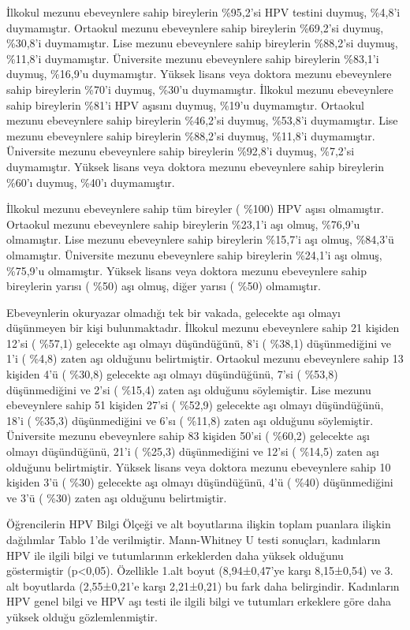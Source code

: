 \documentclass[turkish]{article}
\begin{document}
İlkokul mezunu ebeveynlere sahip bireylerin  \%95,2’si HPV testini duymuş,  \%4,8’i duymamıştır. Ortaokul mezunu ebeveynlere sahip bireylerin  \%69,2’si duymuş,  \%30,8’i duymamıştır. Lise mezunu ebeveynlere sahip bireylerin  \%88,2’si duymuş,  \%11,8’i duymamıştır. Üniversite mezunu ebeveynlere sahip bireylerin  \%83,1’i duymuş,  \%16,9’u duymamıştır. Yüksek lisans veya doktora mezunu ebeveynlere sahip bireylerin  \%70’i duymuş,  \%30’u duymamıştır.
İlkokul mezunu ebeveynlere sahip bireylerin  \%81’i HPV aşısını duymuş,  \%19’u duymamıştır. Ortaokul mezunu ebeveynlere sahip bireylerin  \%46,2’si duymuş,  \%53,8’i duymamıştır. Lise mezunu ebeveynlere sahip bireylerin  \%88,2’si duymuş,  \%11,8’i duymamıştır. Üniversite mezunu ebeveynlere sahip bireylerin  \%92,8’i duymuş,  \%7,2’si duymamıştır. Yüksek lisans veya doktora mezunu ebeveynlere sahip bireylerin  \%60’ı duymuş,  \%40’ı duymamıştır.

İlkokul mezunu ebeveynlere sahip tüm bireyler ( \%100) HPV aşısı olmamıştır. Ortaokul mezunu ebeveynlere sahip bireylerin  \%23,1’i aşı olmuş,  \%76,9’u olmamıştır. Lise mezunu ebeveynlere sahip bireylerin  \%15,7’i aşı olmuş,  \%84,3’ü olmamıştır. Üniversite mezunu ebeveynlere sahip bireylerin  \%24,1’i aşı olmuş,  \%75,9’u olmamıştır. Yüksek lisans veya doktora mezunu ebeveynlere sahip bireylerin yarısı ( \%50) aşı olmuş, diğer yarısı ( \%50) olmamıştır.

Ebeveynlerin okuryazar olmadığı tek bir vakada, gelecekte aşı olmayı düşünmeyen bir kişi bulunmaktadır. İlkokul mezunu ebeveynlere sahip 21 kişiden 12’si ( \%57,1) gelecekte aşı olmayı düşündüğünü, 8’i ( \%38,1) düşünmediğini ve 1’i ( \%4,8) zaten aşı olduğunu belirtmiştir. Ortaokul mezunu ebeveynlere sahip 13 kişiden 4’ü ( \%30,8) gelecekte aşı olmayı düşündüğünü, 7’si ( \%53,8) düşünmediğini ve 2’si ( \%15,4) zaten aşı olduğunu söylemiştir. Lise mezunu ebeveynlere sahip 51 kişiden 27’si ( \%52,9) gelecekte aşı olmayı düşündüğünü, 18’i ( \%35,3) düşünmediğini ve 6’sı ( \%11,8) zaten aşı olduğunu söylemiştir. Üniversite mezunu ebeveynlere sahip 83 kişiden 50’si ( \%60,2) gelecekte aşı olmayı düşündüğünü, 21’i ( \%25,3) düşünmediğini ve 12’si ( \%14,5) zaten aşı olduğunu belirtmiştir. Yüksek lisans veya doktora mezunu ebeveynlere sahip 10 kişiden 3’ü ( \%30) gelecekte aşı olmayı düşündüğünü, 4’ü ( \%40) düşünmediğini ve 3’ü ( \%30) zaten aşı olduğunu belirtmiştir.

Öğrencilerin HPV Bilgi Ölçeği ve alt boyutlarına ilişkin toplam puanlara ilişkin dağılımlar Tablo 1’de verilmiştir. Mann-Whitney U testi sonuçları, kadınların HPV ile ilgili bilgi ve tutumlarının erkeklerden daha yüksek olduğunu göstermiştir (p<0,05). Özellikle 1.alt boyut (8,94±0,47’ye karşı 8,15±0,54) ve 3. alt boyutlarda (2,55±0,21’e karşı 2,21±0,21) bu fark daha belirgindir. Kadınların HPV genel bilgi ve HPV aşı testi ile ilgili bilgi ve tutumları erkeklere göre daha yüksek olduğu gözlemlenmiştir.
\end{document}
